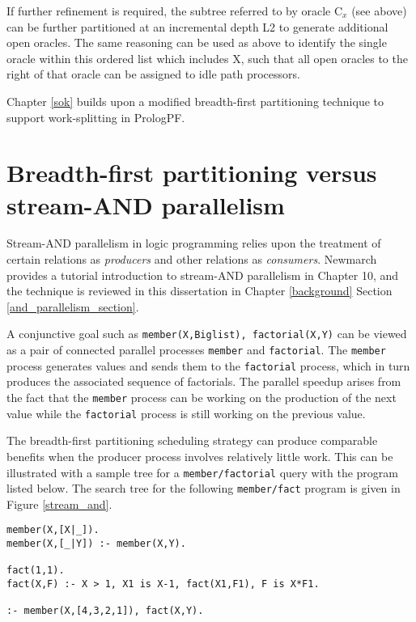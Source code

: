 If further refinement is required, the subtree referred to by oracle C$_x$ (see above) can
be further partitioned at an incremental depth L2 to generate additional open oracles.
The same reasoning can be used as above to identify the single oracle within this ordered
list which includes X, such that all open oracles to the right of that oracle can be
assigned to idle path processors.

Chapter \ref{sok} builds upon a modified breadth-first partitioning technique to support
work-splitting in PrologPF.

\section{Breadth-first partitioning versus stream-AND parallelism} %
\label{bfp_stream_and}

Stream-AND parallelism in logic programming relies upon the treatment of
certain relations as \textit{producers} and other relations as \textit{consumers}.
Newmarch provides a tutorial introduction to stream-AND parallelism
in \cite{New90} Chapter 10, and the
technique is reviewed in this dissertation in
Chapter \ref{background} Section \ref{and_parallelism_section}.

A conjunctive goal such as \texttt{member(X,Biglist), factorial(X,Y)} can be
viewed as a pair of connected parallel processes \texttt{member} and
\texttt{factorial}.  The \texttt{member} process generates values and sends them
to the \texttt{factorial} process, which in turn produces the associated sequence
of factorials.  The parallel speedup arises from the fact that the \texttt{member}
process can be working on the production of the next value while the \texttt{factorial}
process is still working on the previous value.

The breadth-first partitioning scheduling strategy can produce comparable benefits
when the producer process involves relatively little work.
This can be illustrated with
a sample tree for a \texttt{member/factorial} query with the program listed below.
The search tree for the following \texttt{member/fact} program is given in
Figure \ref{stream_and}.

\begin{verbatim}
member(X,[X|_]).
member(X,[_|Y]) :- member(X,Y).

fact(1,1).
fact(X,F) :- X > 1, X1 is X-1, fact(X1,F1), F is X*F1.

:- member(X,[4,3,2,1]), fact(X,Y).
\end{verbatim}

